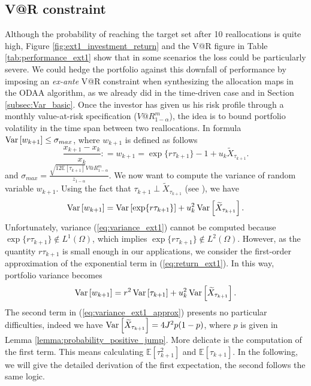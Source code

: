 \subsection{V@R constraint}
Although the probability of reaching the target set after 10 reallocations is quite high, Figure \ref{fig:ext1_investment_return} and the V@R figure in Table \ref{tab:performance_ext1} show that in some scenarios the loss could be particularly severe. We could hedge the portfolio against this downfall of performance by imposing an \textit{ex-ante} V@R constraint when synthesizing the allocation maps in the \gls{ODAA} algorithm, as we already did in the time-driven case and in Section \ref{subsec:Var_basic}. Once the investor has given us his risk profile through a monthly value-at-risk specification ($V@R^m_{1-\alpha}$), the idea is to bound portfolio volatility in the time span between two reallocations. In formula $\operatorname{Var}\left[w_{k+1}\right] \leq \sigma_{max}$, where $w_{k+1}$ is defined as follows
\begin{equation}\label{eq:return_ext1}
\frac{x_{k+1}-x_k}{x_k}\colon=w_{k+1}=\exp\{r\tau_{k+1}\}-1+u_k\widetilde{X}_{\tau_{k+1}}.
\end{equation}
and $\sigma_{max} = \frac{\sqrt{12\mathbb{E}[\tau_{k+1}]}V@R^m_{1-\alpha}}{z_{1-\alpha}}$.
We now want to compute the variance of random variable $w_{k+1}$. Using the fact that $\tau_{k+1} \perp \widetilde{X}_{\tau_{k+1}}$ (see \cite{baldi2017}), we have
\begin{equation}\label{eq:variance_ext1}
\operatorname{Var}\left[w_{k+1}\right] = \operatorname{Var}\left[\exp\{r\tau_{k+1}\}\right] + u_k^2\operatorname{Var}\left[\widetilde{X}_{\tau_{k+1}}\right].
\end{equation}
Unfortunately, variance (\ref{eq:variance_ext1}) cannot be computed because $\exp\{r\tau_{k+1}\} \notin L^1(\Omega)$, which implies $\exp\{r\tau_{k+1}\} \notin L^2(\Omega)$. However, as the quantity $r\tau_{k+1}$ is small enough in our applications, we consider the first-order approximation of the exponential term in (\ref{eq:return_ext1}). In this way, portfolio variance becomes
\begin{equation}\label{eq:variance_ext1_approx}
\operatorname{Var}\left[w_{k+1}\right] = r^2\operatorname{Var}\left[\tau_{k+1}\right] + u_k^2\operatorname{Var}\left[\widetilde{X}_{\tau_{k+1}}\right].
\end{equation}
The second term in (\ref{eq:variance_ext1_approx}) presents no particular difficulties, indeed we have $\operatorname{Var}\left[\widetilde{X}_{\tau_{k+1}}\right] = 4J^2p(1-p)$, where $p$ is given in Lemma \ref{lemma:probability_positive_jump}. More delicate is the computation of the first term. This means calculating $\mathbb{E}[\tau_{k+1}^2]$ and $\mathbb{E}[\tau_{k+1}]$.
In the following, we will give the detailed derivation of the first expectation, the second follows the same logic.


